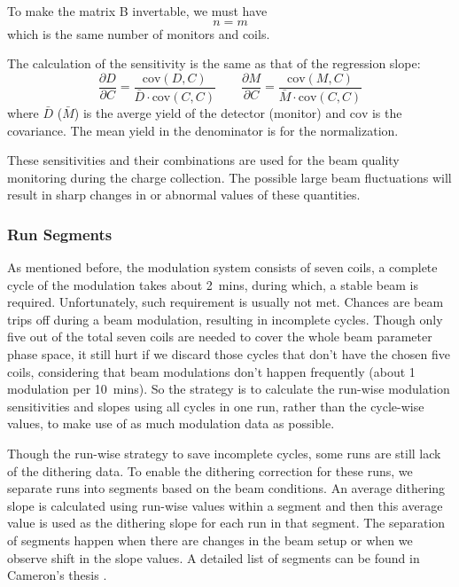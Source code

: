 To make the matrix B invertable, we must have
\begin{equation}
    n = m
\end{equation}
which is the same number of monitors and coils.

The calculation of the sensitivity is the same as that of the regression slope:
\begin{equation}
    \frac{\partial D}{\partial C} = \frac{\text{cov}(D, C)}{\bar{D} \cdot \text{cov}(C, C)}
    \qquad
    \frac{\partial M}{\partial C} = \frac{\text{cov}(M, C)}{\bar{M} \cdot \text{cov}(C, C)}
\end{equation}
where $\bar{D}$ ($\bar{M}$) is the averge yield of the detector (monitor) and 
$\text{cov}$ is the covariance. The
mean yield in the denominator is for the normalization. 

These sensitivities and their combinations are used for the beam quality monitoring 
during the charge collection. The possible large beam fluctuations will result 
in sharp changes in or abnormal values of these quantities.

\subsubsection{Run Segments}
As mentioned before, the modulation system consists of seven coils, a complete 
cycle of the modulation takes about 2~mins, during which, a stable beam is required.
Unfortunately, such requirement is usually not met. Chances are
beam trips off during a beam modulation, resulting in incomplete cycles. Though 
only five out of the total seven coils are needed to cover the whole beam parameter 
phase space, it still hurt if we discard those cycles that don't have the chosen five coils,
considering that beam modulations don't happen frequently (about 1 modulation per 10~mins).
So the strategy is to calculate the run-wise modulation sensitivities and slopes
using all cycles in one run, rather than the cycle-wise values, to make use of 
as much modulation data as possible.

Though the run-wise strategy to save incomplete cycles, some runs are still
lack of the dithering data. To enable the dithering correction for these runs, 
we separate runs into segments based on the beam conditions. An average dithering slope
is calculated using run-wise values within a segment and then this average value 
is used as the dithering slope for each run in that segment. The separation
of segments happen when there are changes in the beam setup or when we observe shift
in the slope values. A detailed list of segments can be found in Cameron's thesis \cite{Cameron2021}.

